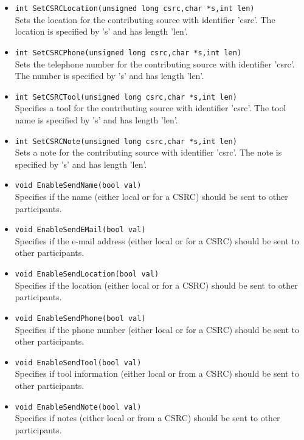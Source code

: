 \begin{itemize}
\item {\tt int SetCSRCLocation(unsigned long csrc,char *s,int len)}\\
	Sets the location for the contributing source with identifier 'csrc'.
	The location is specified by 's' and has length 'len'.

\item {\tt int SetCSRCPhone(unsigned long csrc,char *s,int len)}\\
	Sets the telephone number for the contributing source with identifier
	'csrc'.	The number is specified by 's' and has length 'len'.

\item {\tt int SetCSRCTool(unsigned long csrc,char *s,int len)}\\
	Specifies a tool for the contributing source with identifier 'csrc'.
	The tool name is specified by 's' and has length 'len'.

\item {\tt int SetCSRCNote(unsigned long csrc,char *s,int len)}\\
	Sets a note for the contributing source with identifier 'csrc'.	The
	note is specified by 's' and has length 'len'.

\item {\tt void EnableSendName(bool val)}\\
	Specifies if the name (either local or for a CSRC) should be sent
	to other participants.
	
\item {\tt void EnableSendEMail(bool val)}\\
	Specifies if the e-mail address (either local or for a CSRC) should
	be sent to other participants.
	
\item {\tt void EnableSendLocation(bool val)}\\
	Specifies if the location (either local or for a CSRC) should be
	sent to other participants.
	
\item {\tt void EnableSendPhone(bool val)}\\
	Specifies if the phone number (either local or for a CSRC) should be
	sent to other participants.
	
\item {\tt void EnableSendTool(bool val)}\\
	Specifies if tool information (either local or from a CSRC) should
	be sent	to other participants.
	
\item {\tt void EnableSendNote(bool val)}\\
	Specifies if notes (either local or from a CSRC) should be sent
	to other participants.
	

\end{itemize}
